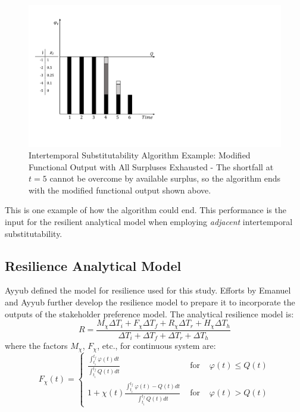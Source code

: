 \documentclass[preprint,12pt]{elsarticle}
\begin{document}
\begin{figure}[h]
  \centering\includegraphics[width=\textwidth]{Chi2-6.pdf}
  \caption{Intertemporal Substitutability Algorithm Example: Modified
    Functional Output with All Surpluses Exhausted - The shortfall at
    $t=5$ cannot be overcome by available surplus, so the algorithm
    ends with the modified functional output shown above.}
  \label{f:Chi2-6}
\end{figure}

This is one example of how the algorithm could
end. This performance is the input for the resilient
analytical model when employing \emph{adjacent} intertemporal
substitutability. 
% 
% 

\subsection{Resilience Analytical Model}


Ayyub \cite{Ayyub2014a} defined the model for resilience used for
this study. Efforts by Emanuel and Ayyub
\cite{Emanuel2017,Emanuel2018} further develop the resilience model
to prepare it to incorporate the outputs of the stakeholder preference
model. The analytical resilience model is:
\begin{equation}
  \label{e:contResilience}
    R = \frac{M_{\chi} \Delta T_i + F_{\chi} \Delta T_f + R_{\chi}
    \Delta T_r + H_{\chi} \Delta T_h}
  {\Delta T_i + \Delta T_f + \Delta T_r + \Delta T_h}
\end{equation}
where the factors $M_{\chi}$, $F_{\chi}$, etc., for continuous system are:
\begin{equation}
  \label{e:RPC}
  F_{\chi}(t) = \left\{\begin{array}{lcr}
      \frac{\displaystyle\int_{t_i}^{t_f}\varphi(t)dt}{\displaystyle\int_{t_i}^{t_f}Q(t)dt}
      & \text{ for } & \varphi(t) \leq Q(t) \\
      1 + \chi(t)
      \frac{\displaystyle\int_{t_i}^{t_f}\varphi(t)-Q(t)dt}{\displaystyle\int_{t_i}^{t_f}Q(t)dt}
      & \text{ for } & \varphi(t) > Q(t)
      \end{array}\right.
\end{equation}
\end{document}
